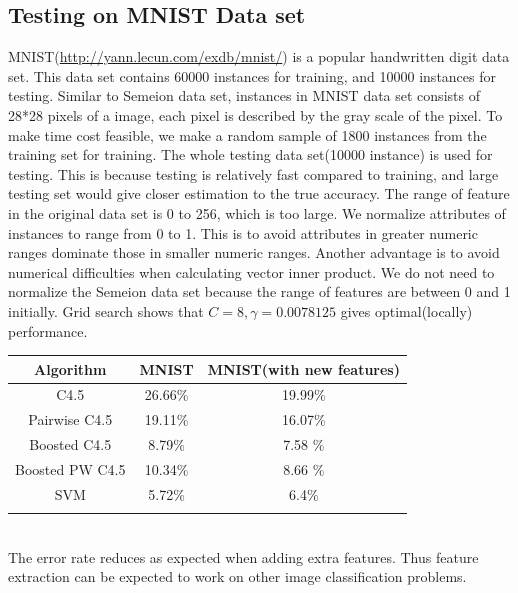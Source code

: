 \documentclass[a4paper,11pt]{article}
\begin{document}
\subsection{Testing on MNIST Data set}
MNIST(\url{http://yann.lecun.com/exdb/mnist/}) is a popular handwritten digit data set. This data set contains 60000 instances for training, and 10000 instances for testing.  Similar to Semeion data set, instances in MNIST data set consists of 28*28 pixels of a image, each pixel is described by the gray scale of the pixel. To make time cost feasible, we make a random sample of 1800 instances from the training set for training. The whole testing data set(10000 instance) is used for testing. This is because testing is relatively fast compared to training, and large testing set would give closer estimation to the true accuracy. The range of feature in the original data set is 0 to 256, which is too large. We normalize attributes of instances to range from 0 to 1. This is to avoid attributes in greater numeric ranges dominate those in smaller numeric ranges. Another advantage is to avoid numerical difficulties when calculating vector inner product\cite{svm}. We do not need to normalize the Semeion data set because the range of features are between 0 and 1 initially. Grid search shows that $C=8, \gamma=0.0078125$ gives optimal(locally) performance.\\
\vspace{0.5cm}
\begin{tabular}{c c c}
Algorithm	              & MNIST	& MNIST(with new features)\\
\hline \hline
C4.5                     & 26.66\%  & 19.99\%\\
Pairwise C4.5            &19.11\%   & 16.07\%\\
Boosted C4.5             & 8.79\%	& 7.58 \%\\
Boosted PW C4.5	         & 10.34\%  & 8.66 \%\\
SVM                      & 5.72\%   & 6.4\%\\
  \\
\end{tabular}
\vspace{0.5cm}\\
The error rate reduces as expected when adding extra features. Thus feature extraction can be expected to work on other image classification problems.\\
\end{document}
